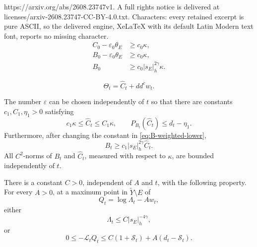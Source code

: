 \documentclass[10pt,a4paper]{amsart}
\newcommand{\ddc}{dd^c}
\begin{document}
https://arxiv.org/abs/2608.23747v1. A full rights notice is delivered at licenses/arxiv-2608.23747-CC-BY-4.0.txt. Characters: every retained excerpt is pure ASCII, so the delivered engine, XeLaTeX with its default Latin Modern text font, reports no missing character.
\begin{align}
 C_0-\varepsilon_0\theta_{E}&\geq c_0\kappa,
 \label{eq:C-exceptional-positive}\\
 B_0-\varepsilon_0\theta_{E}&\geq c_0\kappa,
 \label{eq:B-exceptional-positive}\\
 B_0&\geq c_0|s_E|_{h}^{2\gamma}\kappa.
 \label{eq:B-weighted-lower}
\end{align}

\begin{equation}\label{eq:Theta-hatC-w}
 \Theta_t=\widehat C_t+\ddc w_t.
\end{equation}

\begin{lemma}
\label{lem:corrected-reference}
The number $\varepsilon$ can be chosen independently of $t$ so that
there are constants $c_1,C_1,\eta_1>0$ satisfying
\begin{equation}\label{eq:hatC-uniform}
 c_1\kappa\leq\widehat C_t\leq C_1\kappa,
 \qquad
 P_{B_t}(\widehat C_t)\leq d_t-\eta_1.
\end{equation}
Furthermore, after changing the constant in
\eqref{eq:B-weighted-lower},
\begin{equation}\label{eq:B-weighted-hatC}
 B_t\geq c_1|s_E|_{h}^{2\gamma}
 \widehat C_t.
\end{equation}
All $C^2$-norms of $B_t$ and $\widehat C_t$, measured with
respect to $\kappa$, are bounded independently of $t$.
\end{lemma}

\begin{lemma}
\label{lem:weighted-trace}

There is a constant $C>0$, independent of $A$ and $t$, with the
following property. For every $A>0$, at a maximum point in
$\widetilde Y\setminus E$ of
\[
 Q_t=\log\Lambda_t-Aw_t,
\]
either
\begin{equation}\label{eq:weighted-alternative}
 \Lambda_t\leq
 C|s_E|_{h}^{-4\gamma},
\end{equation}
or
\begin{equation}\label{eq:maximum-inequality}
 0\leq-\mathcal L_tQ_t
 \leq C(1+\mathcal S_t)+A(d_t-\mathcal S_t).
\end{equation}
\end{lemma}
\end{document}
